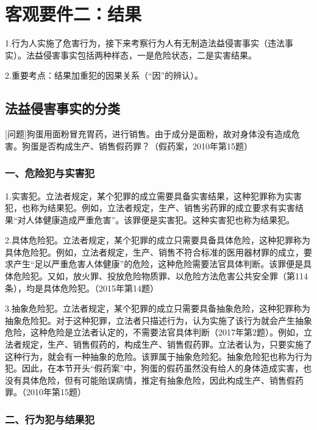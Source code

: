 \chapter{客观要件二：结果}

\begin{EditionOpeningPanel}
1.行为人实施了危害行为，接下来考察行为人有无制造法益侵害事实（违法事实）。法益侵害事实包括两种样态，一是危险状态，二是实害结果。

2.重要考点：结果加重犯的因果关系（“因”的辨认）。
\end{EditionOpeningPanel}

\section{法益侵害事实的分类}

[问题]狗蛋用面粉冒充胃药，进行销售。由于成分是面粉，故对身体没有造成危害。狗蛋是否构成生产、销售假药罪？（假药案，2010年第15题）

\subsection*{一、危险犯与实害犯}

1.实害犯。立法者规定，某个犯罪的成立需要具备实害结果，这种犯罪称为实害犯，也称为结果犯。例如，立法者规定，生产、销售劣药罪的成立要求有实害结果“对人体健康造成严重危害”。该罪便是实害犯。这种实害犯也称为结果犯。

2.具体危险犯。立法者规定，某个犯罪的成立只需要具备具体危险，这种犯罪称为具体危险犯。例如，立法者规定，生产、销售不符合标准的医用器材罪的成立，要求产生“足以严重危害人体健康”的危险，这种危险需要法官具体判断。该罪便是具体危险犯。又如，放火罪、投放危险物质罪、以危险方法危害公共安全罪（第114条），均是具体危险犯。（2015年第14题）

3.抽象危险犯。立法者规定，某个犯罪的成立只需要具备抽象危险，这种犯罪称为抽象危险犯。对于这种犯罪，立法者只描述行为，认为实施了该行为就会产生抽象危险，这种危险是立法者认定的，不需要法官具体判断（2017年第2题）。例如，立法者规定，生产、销售假药的，构成生产、销售假药罪。立法者认为，只要实施了这种行为，就会有一种抽象的危险。该罪属于抽象危险犯。抽象危险犯也称为行为犯。因此，在本节开头“假药案”中，狗蛋的假药虽然没有给人的身体造成实害，也没有具体危险，但有可能贻误病情，推定有抽象危险，因此构成生产、销售假药罪。（2010年第15题）

\subsection*{二、行为犯与结果犯}

